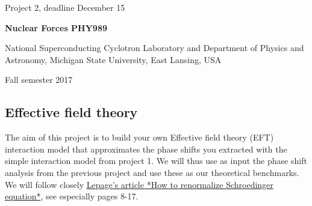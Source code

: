 \documentclass[%
oneside,                 %
final,                   %
10pt]{article}
\begin{document}

\newcommand{\exercisesection}[1]{\subsection*{#1}}






\thispagestyle{empty}

\begin{center}
{\LARGE\bf
\begin{spacing}{1.25}
Project 2, deadline  December 15
\end{spacing}
}
\end{center}


\begin{center}
{\bf Nuclear Forces PHY989}
\end{center}

    \begin{center}
\centerline{{\small National Superconducting Cyclotron Laboratory and Department of Physics and Astronomy, Michigan State University, East Lansing, USA}}
\end{center}
    

\begin{center}
Fall semester 2017
\end{center}

\vspace{1cm}


\subsection{Effective field theory}

The aim of this project is to build your own Effective field theory
(EFT) interaction model that approximates the phase shifts you
extracted with the simple interaction model from project 1. We will
thus use as input the phase shift analysis from the previous project
and use these as our theoretical benchmarks.  We will follow closely
\href{{https://arxiv.org/abs/nucl-th/9706029}}{Lepage's article *How to renormalize Schroedinger
equation*}, see especially
pages 8-17.
\end{document}
